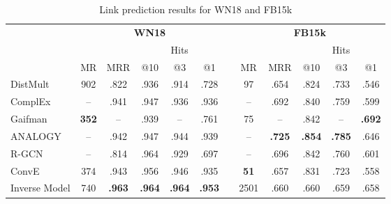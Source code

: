 \documentclass[letterpaper]{article}
\newcommand{\citep}{\cite}
\begin{document}
\begin{table*}[t]
	\caption{Link prediction results for WN18 and FB15k}
	\label{results_dirty}
	\centering
	\begin{tabularx}{\textwidth}{lccccccccccc}
	    \toprule
		 & \multicolumn{5}{c}{{ \bf WN18}} & & \multicolumn{5}{c}{{\bf FB15k}} \\
		 	\cmidrule{2-6}
    	\cmidrule{8-12}
    	 & & & \multicolumn{3}{c}{Hits} & & & & \multicolumn{3}{c}{Hits} \\
		& MR & MRR & @10 & @3 & @1 & & MR & MRR & @10 & @3 & @1  \\
		\midrule
		DistMult~\citep{yang15:embedding} & 902 & .822 & .936 & .914 & .728 & & 97 & .654 & .824 & .733 & .546 \\
		ComplEx~\citep{DBLP:conf/icml/TrouillonWRGB16} & -- & .941 & .947  & .936 &  .936 & & -- & .692 & .840 & .759 & .599 \\
		Gaifman~\citep{DBLP:conf/nips/Niepert16} & \textbf{352} & -- & .939 & -- & .761 & & 75 & -- & .842 & -- & \textbf{.692} \\
		ANALOGY~\citep{2017arXiv170502426L} & -- &  .942  & .947 & .944 & .939 & & -- & \textbf{.725} & \textbf{.854} & \textbf{.785} & .646 \\
		R-GCN~\citep{schlichtkrull2017modeling} & -- & .814 & .964 & .929 & .697 & & -- & .696 & .842 & .760 & .601 \\
		\midrule
		ConvE & 374 & .943 & .956 & .946 & .935 & & {\bf 51} & .657 & .831 & .723 & .558 \\		
		Inverse Model & 740 & \textbf{.963} & \textbf{.964} & \textbf{.964} & \textbf{.953} & & 2501 & .660 & .660 & .659 & .658 \\
		\bottomrule
	\end{tabularx}
\end{table*}
\end{document}
